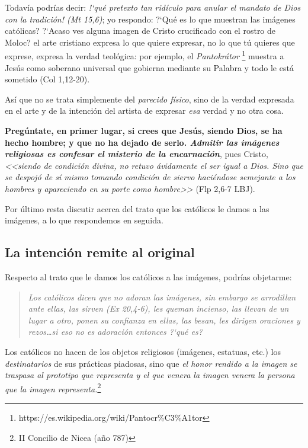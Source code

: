 \documentclass{article}
\begin{document}
Todav\'{i}a podr\'{i}as decir: \emph{!`qu\'e pretexto tan rid\'{i}culo para anular el mandato de Dios con la tradici\'on! (Mt 15,6)}; yo respondo: ?`Qu\'e es lo que muestran las im\'agenes cat\'olicas? ?`Acaso ves alguna imagen de Cristo crucificado con el rostro de Moloc? el arte cristiano expresa lo que quiere expresar, no lo que t\'u quieres que exprese, expresa la verdad teol\'ogica: por ejemplo, el \emph{Pantokr\'ator}%
    \footnote{https://es.wikipedia.org/wiki/Pantocr\%C3\%A1tor}
muestra a Jes\'us como soberano universal que gobierna mediante su Palabra y todo le est\'a sometido (Col 1,12-20).

As\'{i} que no se trata simplemente del \emph{parecido f\'{i}sico}, sino de la verdad expresada en el arte y de la intenci\'on del artista de expresar \emph{esa} verdad y no otra cosa.

\textbf{Preg\'untate, en primer lugar, si crees que Jes\'us, siendo Dios, se ha hecho hombre; y que no ha dejado de serlo. \emph{Admitir las im\'agenes religiosas es confesar el misterio de la encarnaci\'on}}, pues Cristo, \emph{<<siendo de condición divina, no retuvo ávidamente el ser igual a Dios. Sino que se despojó de sí mismo tomando condición de siervo haciéndose semejante a los hombres y apareciendo en su porte como hombre>>} (Flp 2,6-7 LBJ).

Por \'ultimo resta discutir acerca del trato que los cat\'olicos le damos a las im\'agenes, a lo que respondemos en seguida.

\subsection{La intenci\'on remite al original}

Respecto al trato que le damos los cat\'olicos a las im\'agenes, podr\'{i}as objetarme:

\begin{quote}
\emph{Los cat\'olicos dicen que no adoran las im\'agenes, sin embargo se arrodillan ante ellas, las sirven (Ex 20,4-6), les queman incienso, las llevan de un lugar a otro, ponen su confianza en ellas, las besan, les dirigen oraciones y rezos\ldots si eso no es adoraci\'on entonces ?`qu\'e es?}
\end{quote}

\noindent
Los cat\'olicos no hacen de los objetos religiosos (im\'agenes, estatuas, etc.) los \emph{destinatarios} de sus pr\'acticas piadosas, sino que \emph{el honor rendido a la imagen se traspasa al prototipo que representa y el que venera la imagen venera la persona que la imagen representa.}\footnote{II Concilio de Nicea (a\~no 787)}
\end{document}
